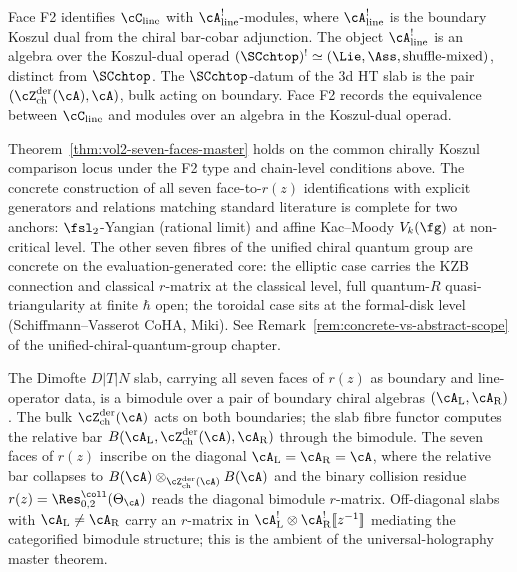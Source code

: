 \begin{remark}
\label{rem:dnp-master-koszul-dual-operad}
Face F2 identifies $\cC_{\mathrm{line}}$ with
$\cA^{!}_{\mathrm{line}}$-modules, where $\cA^{!}_{\mathrm{line}}$
is the boundary Koszul dual from the chiral bar-cobar adjunction.
The object $\cA^{!}_{\mathrm{line}}$ is an algebra over the
Koszul-dual operad
$(\SCchtop)^{!} \simeq (\Lie, \Ass, \text{shuffle-mixed})$,
distinct from $\SCchtop$. The $\SCchtop$-datum of the 3d HT slab
is the pair $(\cZ^{\mathrm{der}}_{\mathrm{ch}}(\cA), \cA)$, bulk
acting on boundary. Face F2 records the equivalence between
$\cC_{\mathrm{line}}$ and modules over an algebra in the
Koszul-dual operad.
\end{remark}

\begin{remark}
\label{rem:dnp-master-concrete-vs-abstract}
Theorem~\ref{thm:vol2-seven-faces-master} holds on the common
chirally Koszul comparison locus under the F2 type and
chain-level conditions above. The concrete construction of all
seven face-to-$r(z)$ identifications with explicit generators and
relations matching standard literature is complete for two
anchors: $\fsl_{2}$-Yangian (rational limit) and affine
Kac--Moody $V_k(\fg)$ at non-critical level. The other seven
fibres of the unified chiral quantum group are concrete on the
evaluation-generated core: the elliptic case carries the KZB
connection and classical $r$-matrix at the classical level,
full quantum-$R$ quasi-triangularity at finite $\hbar$ open; the
toroidal case sits at the formal-disk level
(Schiffmann--Vasserot CoHA, Miki). See
Remark~\ref{rem:concrete-vs-abstract-scope} of the
unified-chiral-quantum-group chapter.
\end{remark}

\begin{remark}
\label{rem:dnp-master-slab-bimodule}
The Dimofte $D|T|N$ slab, carrying all seven faces of $r(z)$ as
boundary and line-operator data, is a bimodule over a pair of
boundary chiral algebras
$(\cA_{\mathrm{L}}, \cA_{\mathrm{R}})$. The bulk
$\cZ^{\mathrm{der}}_{\mathrm{ch}}(\cA)$ acts on both boundaries;
the slab fibre functor computes the relative bar
$B(\cA_{\mathrm{L}}, \cZ^{\mathrm{der}}_{\mathrm{ch}}(\cA),
\cA_{\mathrm{R}})$ through the bimodule. The seven faces of
$r(z)$ inscribe on the diagonal
$\cA_{\mathrm{L}} = \cA_{\mathrm{R}} = \cA$, where the relative
bar collapses to
$B(\cA)\otimes_{\cZ^{\mathrm{der}}_{\mathrm{ch}}(\cA)} B(\cA)$
and the binary collision residue
$r(z) = \Res^{\coll}_{0,2}(\Theta_{\cA})$ reads the diagonal
bimodule $r$-matrix. Off-diagonal slabs with
$\cA_{\mathrm{L}} \neq \cA_{\mathrm{R}}$ carry an $r$-matrix in
$\cA_{\mathrm{L}}^{!} \otimes \cA_{\mathrm{R}}^{!}[\![z^{-1}]\!]$
mediating the categorified bimodule structure; this is the
ambient of the universal-holography master theorem.
\end{remark}

